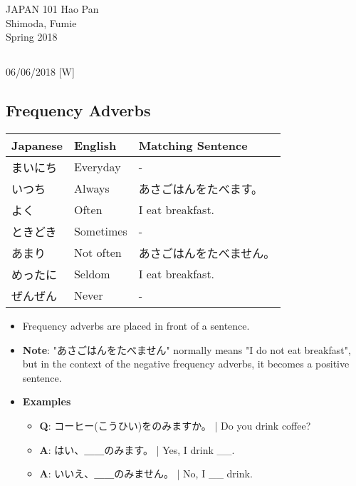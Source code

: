 \documentclass{article}
\begin{document}
 \begin{CJK}{UTF8}{min}

\noindent
{JAPAN 101 \hfill Hao Pan}\\
{Shimoda, Fumie}\\
{Spring 2018}


\begin{center}
\section{}
\noindent
{\hfill 06/06/2018 [W]}
\end{center}

\subsection{Frequency Adverbs}

\begin{tabular}{ l | l || l }
Japanese & English & Matching Sentence\\
\hline
まいにち & Everyday & -\\
いつち & Always & あさごはんをたべます。\\
よく & Often & I eat breakfast.\\
ときどき & Sometimes & -\\
\hline
あまり & Not often & あさごはんをたべません。\\
めったに & Seldom & I eat breakfast.\\
ぜんぜん & Never & -\\
\end{tabular}

\begin{itemize}
\item Frequency adverbs are placed in front of a sentence.
\item {\bf Note}: "あさごはんをたべません" normally means "I do not eat breakfast", but in the context of the negative frequency adverbs, it becomes a positive sentence.
\item {\bf Examples}
\begin{itemize}
\item {\bf Q}: コーヒー(こうひい)をのみますか。 | Do you drink coffee?
\item {\bf A}: はい、＿＿のみます。 | Yes, I drink \_\_.
\item {\bf A}: いいえ、＿＿のみません。 | No, I \_\_ drink.
\end{itemize}
\end{itemize}


\end{CJK}
\end{document}
